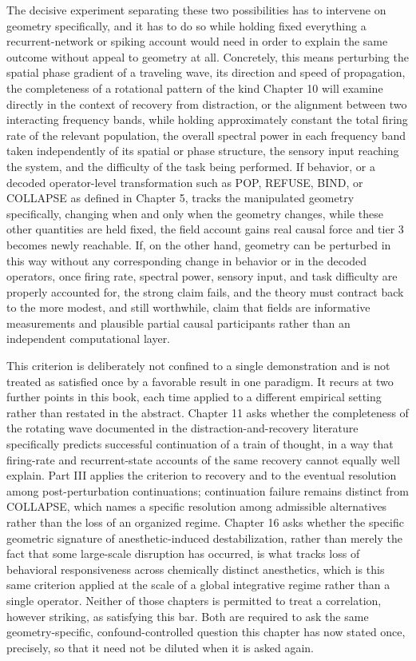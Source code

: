 \documentclass[11pt]{book}
\begin{document}
The decisive experiment separating these two possibilities has to intervene on geometry specifically, and it has to do so while holding fixed everything a recurrent-network or spiking account would need in order to explain the same outcome without appeal to geometry at all. Concretely, this means perturbing the spatial phase gradient of a traveling wave, its direction and speed of propagation, the completeness of a rotational pattern of the kind Chapter 10 will examine directly in the context of recovery from distraction, or the alignment between two interacting frequency bands, while holding approximately constant the total firing rate of the relevant population, the overall spectral power in each frequency band taken independently of its spatial or phase structure, the sensory input reaching the system, and the difficulty of the task being performed. If behavior, or a decoded operator-level transformation such as POP, REFUSE, BIND, or COLLAPSE as defined in Chapter 5, tracks the manipulated geometry specifically, changing when and only when the geometry changes, while these other quantities are held fixed, the field account gains real causal force and tier 3 becomes newly reachable. If, on the other hand, geometry can be perturbed in this way without any corresponding change in behavior or in the decoded operators, once firing rate, spectral power, sensory input, and task difficulty are properly accounted for, the strong claim fails, and the theory must contract back to the more modest, and still worthwhile, claim that fields are informative measurements and plausible partial causal participants rather than an independent computational layer.

This criterion is deliberately not confined to a single demonstration and is not treated as satisfied once by a favorable result in one paradigm. It recurs at two further points in this book, each time applied to a different empirical setting rather than restated in the abstract. Chapter 11 asks whether the completeness of the rotating wave documented in the distraction-and-recovery literature specifically predicts successful continuation of a train of thought, in a way that firing-rate and recurrent-state accounts of the same recovery cannot equally well explain. Part III applies the criterion to recovery and to the eventual resolution among post-perturbation continuations; continuation failure remains distinct from COLLAPSE, which names a specific resolution among admissible alternatives rather than the loss of an organized regime. Chapter 16 asks whether the specific geometric signature of anesthetic-induced destabilization, rather than merely the fact that some large-scale disruption has occurred, is what tracks loss of behavioral responsiveness across chemically distinct anesthetics, which is this same criterion applied at the scale of a global integrative regime rather than a single operator. Neither of those chapters is permitted to treat a correlation, however striking, as satisfying this bar. Both are required to ask the same geometry-specific, confound-controlled question this chapter has now stated once, precisely, so that it need not be diluted when it is asked again.
\end{document}
